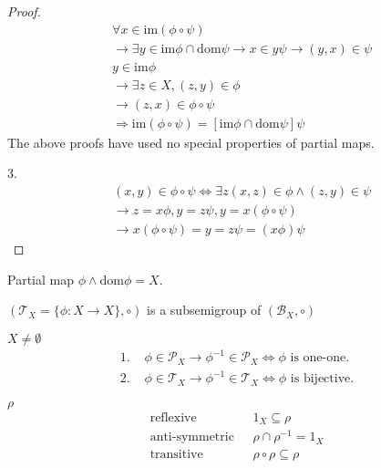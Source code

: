 \begin{Prop}
\begin{proof}
\begin{align*}
            &\forall x\in \mathrm{im}(\phi \circ \psi)  \\
            &\rightarrow \exists y \in \mathrm{im}\phi \cap \mathrm{dom}\psi \rightarrow x\in y\psi \rightarrow (y,x)\in \psi   \\
            &y \in \mathrm{im}\phi \\
            &\rightarrow \exists z \in X, (z,y) \in \phi    \\
            &\rightarrow (z,x)\in \phi \circ \psi \\
            &\Rightarrow \mathrm{im}(\phi \circ \psi)=[\mathrm{im}\phi \cap \mathrm{dom}\psi]\psi
        \end{align*}
        The above proofs have used no special properties of partial maps.

        3.
        \begin{align*}
            &(x,y)\in \phi \circ \psi \Leftrightarrow \exists z (x,z)\in \phi \wedge (z,y)\in \psi  \\
            &\rightarrow z=x\phi ,y=z\psi ,y=x(\phi \circ \psi) \\
            &\rightarrow x(\phi \circ \psi)=y=z\psi =(x\phi )\psi 
        \end{align*}
    \end{proof}
\end{Prop}

\begin{Def}
    Partial map $\phi \wedge \mathrm{dom}\phi =X$. 
\end{Def}

\begin{Prop}
    $(\mathcal{T}_X=\{\phi:X\rightarrow X\}, \circ )$ is a subsemigroup of $(\mathcal{B}_X,\circ )$ 
\end{Prop}

\begin{Prop}
    $X\neq \emptyset$
    \begin{align*}
        \text{1. } & \phi \in \mathcal{P}_X \rightarrow \phi^{-1} \in \mathcal{P}_X \Leftrightarrow \phi \text{ is one-one.}    \\
        \text{2. } & \phi \in \mathcal{T}_X \rightarrow \phi^{-1} \in \mathcal{T}_X \Leftrightarrow \phi \text{ is bijective.}  
    \end{align*}
\end{Prop}

\begin{Rmk}$\rho $
    \begin{align*}
        \text{reflexive} &\text{    }  1_X \subseteq \rho \\
        \text{anti-symmetric} &\text{    } \rho\cap \rho^{-1} =1_X \\
        \text{transitive}  &\text{    } \rho \circ \rho \subseteq \rho 
    \end{align*}
\end{Rmk}

